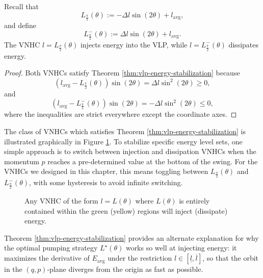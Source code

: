 \begin{cor}
   Recall that
   \[
      L_\frac{\pi}{2}(\theta) := -\Delta l \sin(2\theta) + l_\text{avg}
      ,
   \]
   and define 
   \[
      L^{-}_\frac{\pi}{2}(\theta) := \Delta l \sin(2\theta) + l_\text{avg}
      .
   \]
   The VNHC \(l = L_\frac{\pi}{2}(\theta)\) injects energy into the VLP,
   while \(l = L^{-}_\frac{\pi}{2}(\theta)\) dissipates energy.
\end{cor}
\begin{proof}
   Both VNHCs satisfy Theorem \ref{thm:vlp-energy-stabilization} because
   \[
      \left(l_\text{avg} - L_\frac{\pi}{2}(\theta)\right)\sin(2\theta) = 
      \Delta l \sin^2(2\theta) \geq 0
      ,
   \] 
   and
   \[
      \left(l_\text{avg} - L^{-}_\frac{\pi}{2}(\theta)\right)\sin(2\theta) = 
      - \Delta l \sin^2(2\theta) \leq 0
      ,
   \] 
   where the inequalities are strict everywhere except the coordinate axes.
\end{proof}


The class of VNHCs which satisfies Theorem \ref{thm:vlp-energy-stabilization} is
illustrated graphically in Figure \ref{fig:vlp-energy-in-out}. 
To stabilize specific energy level sets, one simple approach is to switch
between injection and dissipation VNHCs when the momentum \(p\) reaches
a pre-determined value at the bottom of the swing.
For the VNHCs we designed in this chapter, this means toggling
between \(L_\frac{\pi}{2}(\theta)\) and \(L^{-}_\frac{\pi}{2}(\theta)\),
with some hysteresis to avoid infinite switching.  

\begin{figure}
   \centering
   
   \caption{Any VNHC of the form \(l = L(\theta)\) where \(L(\theta)\)
      is entirely contained within
      the green (yellow) regions will inject (dissipate) energy.}
      \label{fig:vlp-energy-in-out}
\end{figure}

Theorem \ref{thm:vlp-energy-stabilization} provides an alternate
explanation for why the optimal pumping strategy \(L^\star(\theta)\) works
so well at injecting energy: it maximizes the derivative of \(E_\text{avg}\)
under the restriction \(l \in [\underline{l},\overline{l}]\), so that the orbit
in the \((q,p)\)-plane diverges from the origin as fast as possible. 

